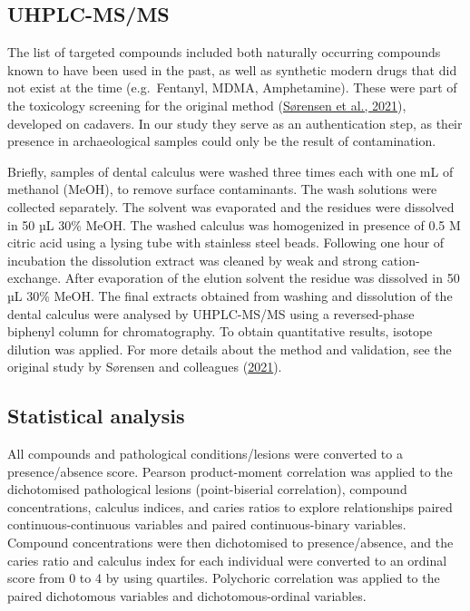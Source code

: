 \documentclass[
  letterpaper,
]{book}
\begin{document}
\hypertarget{uhplc-msms}{%
\subsection{UHPLC-MS/MS}\label{uhplc-msms}}

The list of targeted compounds included both naturally occurring
compounds known to have been used in the past, as well as synthetic
modern drugs that did not exist at the time (e.g.~Fentanyl, MDMA,
Amphetamine). These were part of the toxicology screening for the
original method
(\protect\hyperlink{ref-sorensenDrugsCalculus2021}{Sørensen et al.,
2021}), developed on cadavers. In our study they serve as an
authentication step, as their presence in archaeological samples could
only be the result of contamination.

Briefly, samples of dental calculus were washed three times each with
one mL of methanol (MeOH), to remove surface contaminants. The wash
solutions were collected separately. The solvent was evaporated and the
residues were dissolved in 50 µL 30\% MeOH. The washed calculus was
homogenized in presence of 0.5 M citric acid using a lysing tube with
stainless steel beads. Following one hour of incubation the dissolution
extract was cleaned by weak and strong cation-exchange. After
evaporation of the elution solvent the residue was dissolved in 50 µL
30\% MeOH. The final extracts obtained from washing and dissolution of
the dental calculus were analysed by UHPLC-MS/MS using a reversed-phase
biphenyl column for chromatography. To obtain quantitative results,
isotope dilution was applied. For more details about the method and
validation, see the original study by Sørensen and colleagues
(\protect\hyperlink{ref-sorensenDrugsCalculus2021}{2021}).

\hypertarget{statistical-analysis-1}{%
\subsection{Statistical analysis}\label{statistical-analysis-1}}

All compounds and pathological conditions/lesions were converted to a
presence/absence score. Pearson product-moment correlation was applied
to the dichotomised pathological lesions (point-biserial correlation),
compound concentrations, calculus indices, and caries ratios to explore
relationships paired continuous-continuous variables and paired
continuous-binary variables. Compound concentrations were then
dichotomised to presence/absence, and the caries ratio and calculus
index for each individual were converted to an ordinal score from 0 to 4
by using quartiles. Polychoric correlation was applied to the paired
dichotomous variables and dichotomous-ordinal variables.
\end{document}
